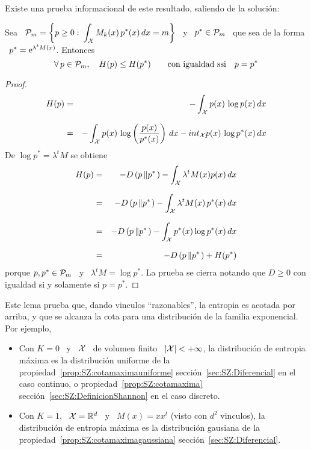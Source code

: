 Existe una prueba informacional de este resultado, saliendo de la soluci\'on:
%
\begin{lema}
  Sea \ $\displaystyle \P_m = \left\{ p \ge 0: \: \int_\X M_k(x) \, p^*(x) \, dx
    =  m \right\}$  \  y \  $p^*  \in \P_m$  \  que sea  de la  forma  \ $p^*  =
  \e^{\lambda^t M(x)}$. Entonces
%
\[
\forall \,  p \in  \P_m, \quad  H(p) \le H(p^*)  \qquad \mbox{con  igualdad ssi}
\quad p = p^*
\]
%
\end{lema}
\begin{proof}
\begin{eqnarray*}
H(p) & = & - \int_\X p(x) \, \log p(x) \, dx\\[2.5mm]
%
& = & - \int_\X p(x) \, \log\left( \frac{p(x)}{p^*(x)} \right) \, dx - int_\X
p(x) \, \log p^*(x) \, dx
\end{eqnarray*}
%
De $\log p^* = \lambda^t M$ se obtiene
%
\begin{eqnarray*}
H(p) & = & - D\left( p \left\| p^* \right. \right) - \int_\X \lambda^t M(x) p(x)
\, dx\\[2.5mm]
%
& = & - D\left( p \left\| p^* \right. \right) - \int_\X \lambda^t M(x) \, p^*(x)
\, dx\\[2.5mm]
%
& = & - D\left( p \left\| p^* \right. \right) - \int_\X p^*(x) \log p^*(x) \,
dx\\[2.5mm]
%
& = & - D\left( p \left\| p^* \right. \right) + H(p^*)
\end{eqnarray*}
%
porque $p,  p^* \in \P_m$ \  y \ $\lambda^t M  = \log p^*$. La  prueba se cierra
notando que $D \ge 0$ con igualdad si y solamente si $p = p^*$.
\end{proof}
%
Este lema prueba que, dando  vinculos ``razonables'', la entropia es acotada por
arriba,  y  que  se alcanza  la  cota  para  una  distribuci\'on de  la  familia
exponencial. Por ejemplo,
%
\begin{itemize}
\item Con  $K =  0$ \  y \  $\X$ \ de  volumen finito  \ $|\X|  < +  \infty$, la
  distribuci\'on  de  entropia m\'axima  es  la  distribuci\'on  uniforme de  la
  propiedad~\ref{prop:SZ:cotamaximauniforme}   secci\'on~\ref{sec:SZ:Diferencial}
  en     el      caso     continuo,     o     propiedad~\ref{prop:SZ:cotamaxima}
  secci\'on~\ref{sec:SZ:DefinicionShannon} en el caso discreto.
%
\item Con  $K =  1$, \ $\X  = \Rset^d$  \ y \  $M(x) = x  x^t$ (visto  con $d^2$
  vinculos),  la  distribuci\'on  de  entropia  m\'axima  es  la  distribuci\'on
  gausiana        de        la       propiedad~\ref{prop:SZ:cotamaximagaussiana}
  secci\'on~\ref{sec:SZ:Diferencial}.
\end{itemize}


